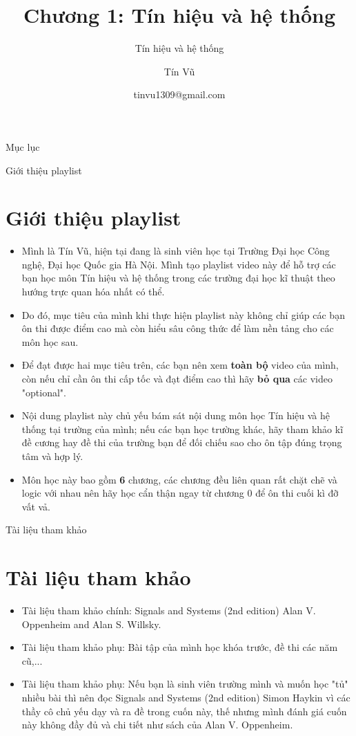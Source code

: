\documentclass[8pt]{beamer}
\title[Chương 1: Tín hiệu và hệ thống] %
{Chương 1: Tín hiệu và hệ thống}
\subtitle{Tín hiệu và hệ thống}
\author[Tín hiệu và hệ thống] %
{Tín Vũ}
\date[VLC 2021] %
{tinvu1309@gmail.com}
\begin{document}
\frame{\titlepage}
\begin{frame}{Mục lục}
\tableofcontents
\end{frame}
\begin{frame}{Giới thiệu playlist}
\section{Giới thiệu playlist}
	\begin{itemize}
		\item Mình là Tín Vũ, hiện tại đang là sinh viên học tại Trường Đại học Công nghệ, Đại học Quốc gia Hà Nội. Mình tạo playlist video này để hỗ trợ các bạn học môn Tín hiệu và hệ thống trong các trường đại học kĩ thuật theo hướng \alert{trực quan hóa} nhất có thể.
		\item Do đó, mục tiêu của mình khi thực hiện playlist này không chỉ giúp các bạn ôn thi được điểm cao mà còn \alert{hiểu sâu công thức để làm nền tảng cho các môn học sau}.
		\item Để đạt được hai mục tiêu trên, các bạn nên xem \textbf{toàn bộ} video của mình, còn nếu chỉ cần ôn thi cấp tốc và đạt điểm cao thì hãy \textbf{bỏ qua} các video "optional".
		\item Nội dung playlist này chủ yếu bám sát nội dung môn học Tín hiệu và hệ thống tại trường của mình; nếu các bạn học trường khác, hãy tham khảo kĩ đề cương hay đề thi của trường bạn để đối chiếu sao cho ôn tập đúng trọng tâm và hợp lý. 
		\item Môn học này bao gồm \textbf{6} chương, các chương đều liên quan rất chặt chẽ và logic với nhau nên hãy học cẩn thận ngay từ \alert{chương 0} để ôn thi cuối kì đỡ vất vả.
	\end{itemize}
\end{frame}
\begin{frame}{Tài liệu tham khảo}
\section{Tài liệu tham khảo}
\begin{itemize}
		\item Tài liệu tham khảo chính: Signals and Systems (2nd edition) Alan V. Oppenheim and Alan S. Willsky.
		\item Tài liệu tham khảo phụ: Bài tập của mình học khóa trước, đề thi các năm cũ,...
		\item Tài liệu tham khảo phụ: Nếu bạn là sinh viên trường mình và muốn học "tủ" nhiều bài thì nên đọc Signals and Systems (2nd edition) Simon Haykin vì các thầy cô chủ yếu dạy và ra đề trong cuốn này, thế nhưng mình đánh giá cuốn này không đầy đủ và chi tiết như sách của Alan V. Oppenheim. 
	\end{itemize}
\end{frame}
\end{document}
